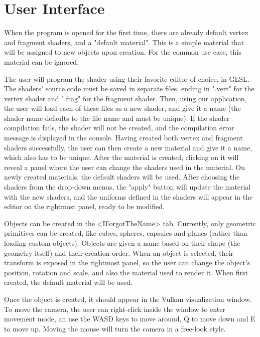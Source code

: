 \section{User Interface}
When the program is opened for the first time, there are already default vertex and fragment shaders, and a "default material". This is a simple material that will be assigned to new objects upon creation. For the common use case, this material can be ignored.

The user will program the shader using their favorite editor of choice, in GLSL. The shaders' source code must be saved in separate files, ending in ".vert" for the vertex shader and ".frag" for the fragment shader. Then, using our application, the user will load each of these files as a new shader, and give it a name (the shader name defaults to the file name and must be unique). If the shader compilation fails, the shader will not be created, and the compilation error message is displayed in the console. Having created both vertex and fragment shaders successfully, the user can then create a new material and give it a name, which also has to be unique. After the material is created, clicking on it will reveal a panel where the user can change the shaders used in the material. On newly created materials, the default shaders will be used. After choosing the shaders from the drop-down menus, the "apply" button will update the material with the new shaders, and the uniforms defined in the shaders will appear in the editor on the rightmost panel, ready to be modified.

Objects can be created in the <IForgotTheName> tab. Currently, only geometric primitives can be created, like cubes, spheres, capsules and planes (rather than loading custom objects). Objects are given a name based on their shape (the geometry itself) and their creation order. When an object is selected, their transform is exposed in the rightmost panel, so the user can change the object's position, rotation and scale, and also the material used to render it. When first created, the default material will be used.

Once the object is created, it should appear in the Vulkan visualization window. To move the camera, the user can right-click inside the window to enter movement mode, an use the WASD keys to move around, Q to move down and E to move up. Moving the mouse will turn the camera in a free-look style.
